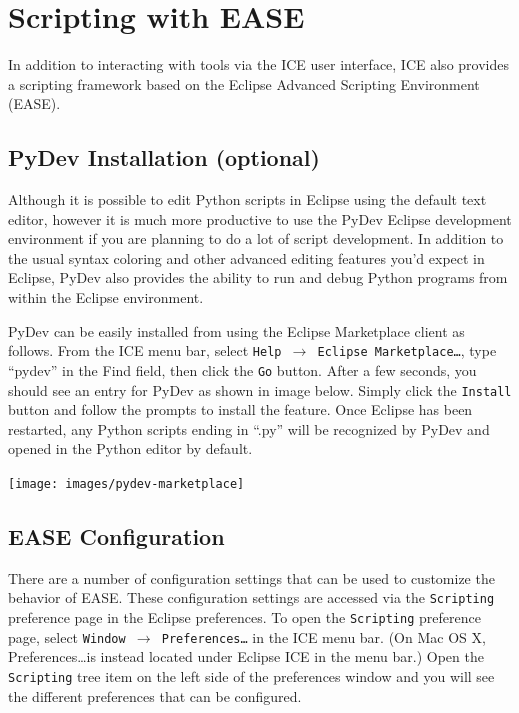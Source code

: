 \section{Scripting with EASE}
In addition to interacting with tools via the ICE user interface, ICE also
provides a scripting framework based on the Eclipse Advanced Scripting
Environment (EASE). 

\subsection{PyDev Installation (optional)} 

Although it is possible to edit Python scripts in Eclipse using the default text editor,
however it is much more productive to use the PyDev Eclipse development
environment if you are planning to do a lot of script development. In addition to the 
usual syntax coloring and other advanced editing features you'd expect in Eclipse, 
PyDev also provides the ability to run and debug Python programs from within the Eclipse environment.

PyDev can be easily installed from using the Eclipse Marketplace client as
follows. From the ICE menu bar, select \texttt{Help $\rightarrow$ Eclipse
Marketplace\ldots}, type ``pydev'' in the Find field, then click the \texttt{Go}
button.
After a few seconds, you should see an entry for PyDev as shown in image below.
Simply click the \texttt{Install} button and follow the prompts to install the feature. Once
Eclipse has been restarted, any Python scripts ending in ``.py'' will be recognized by
PyDev and opened in the Python editor by default.

\begin{center} \texttt{[image: images/pydev-marketplace]}
\end{center}

\subsection{EASE Configuration}

There are a number of configuration settings that can be used to customize the
behavior of EASE. These configuration settings are accessed via the \texttt{Scripting}
preference page in the Eclipse preferences. To open the \texttt{Scripting}
preference page, select \texttt{Window $\rightarrow$ Preferences\ldots} in the
ICE menu bar. (On Mac OS X, Preferences\ldots is instead located under Eclipse
ICE in the menu bar.) Open the \texttt{Scripting} tree item on the left side of
the preferences window and you will see the different preferences that can be
configured.

